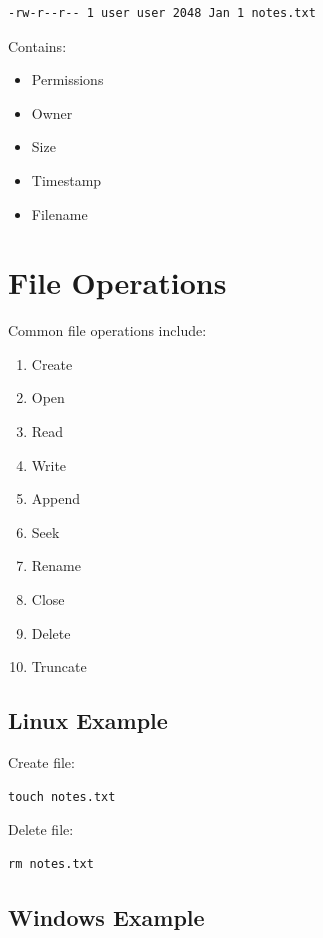 \begin{verbatim}
-rw-r--r-- 1 user user 2048 Jan 1 notes.txt
\end{verbatim}

Contains:

\begin{itemize}
\item Permissions
\item Owner
\item Size
\item Timestamp
\item Filename
\end{itemize}

\section{File Operations}

Common file operations include:

\begin{enumerate}
\item Create
\item Open
\item Read
\item Write
\item Append
\item Seek
\item Rename
\item Close
\item Delete
\item Truncate
\end{enumerate}

\subsection{Linux Example}

Create file:

\begin{verbatim}
touch notes.txt
\end{verbatim}

Delete file:

\begin{verbatim}
rm notes.txt
\end{verbatim}

\subsection{Windows Example}


